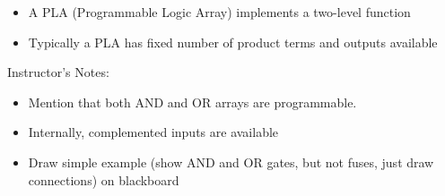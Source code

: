 \begin{frame}[fragile]
\begin{itemize}
	\item A PLA (Programmable Logic Array) implements a two-level
	function
	
	\item Typically a PLA has fixed number of product terms and outputs available
\end{itemize}
\end{frame}
\BNotes\ifnum{}
\begin{frame}[fragile]
Instructor's Notes:
\begin{itemize}
	\item Mention that both AND and OR arrays are programmable.
	\item Internally, complemented inputs are available
	\item Draw simple example (show AND and OR gates, but not fuses,
		just draw connections) on blackboard
\end{itemize}
\end{frame}
\fi\ENotes

